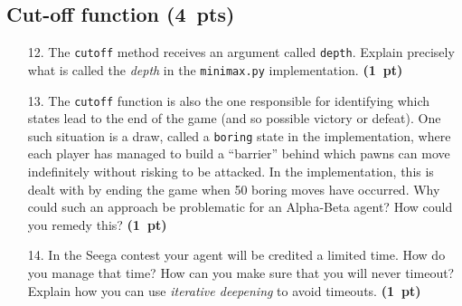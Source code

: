 \documentclass[11pt,a4paper]{report}
\begin{document}
\begin{answers}[9cm]
\end{answers}





\clearpage
\subsection{Cut-off function (4~pts)}


\begin{enumerate}
\item[12.] The \lstinline|cutoff| method receives an argument called
    \lstinline|depth|. Explain precisely what is called the
    \emph{depth} in the \lstinline|minimax.py| implementation. \textbf{(1~pt)}
\end{enumerate}

\begin{answers}[6cm]
\end{answers}





\begin{enumerate}
\item[13.] The \lstinline|cutoff| function is also the one responsible for identifying which states lead to the end of the game (and so possible victory or defeat). One such situation is a draw, called a \lstinline|boring| state in the implementation, where each player has managed to build a ``barrier'' behind which pawns can move indefinitely without risking to be attacked. In the implementation, this is dealt with by ending the game when 50 boring moves have occurred. Why could such an approach be problematic for an Alpha-Beta agent? How could you remedy this? \textbf{(1~pt)}
\end{enumerate}

\begin{answers}[10cm]
\end{answers}





\begin{enumerate}
\item[14.] In the Seega contest your agent will be credited a limited time.
How do you manage that time? How can you make sure that you will never timeout?
Explain how you can use \emph{iterative deepening} to avoid timeouts. \textbf{(1~pt)}
\end{enumerate}
\end{document}
